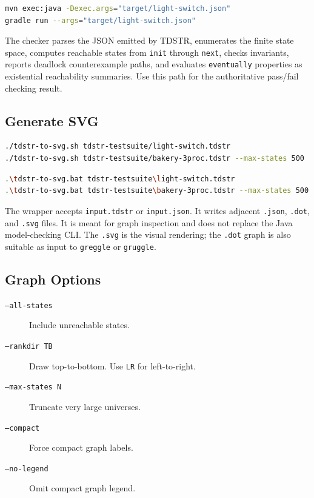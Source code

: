 \documentclass[11pt]{article}
\begin{document}
\begin{lstlisting}[language=bash]
mvn exec:java -Dexec.args="target/light-switch.json"
gradle run --args="target/light-switch.json"
\end{lstlisting}

The checker parses the JSON emitted by TDSTR, enumerates the finite state
space, computes reachable states from \texttt{init} through \texttt{next},
checks invariants, reports deadlock counterexample paths, and evaluates
\texttt{eventually} properties as existential reachability summaries.  Use this
path for the authoritative pass/fail checking result.

\subsection{Generate SVG}

\begin{lstlisting}[language=bash]
./tdstr-to-svg.sh tdstr-testsuite/light-switch.tdstr
./tdstr-to-svg.sh tdstr-testsuite/bakery-3proc.tdstr --max-states 500
\end{lstlisting}

\begin{lstlisting}[language=bash]
.\tdstr-to-svg.bat tdstr-testsuite\light-switch.tdstr
.\tdstr-to-svg.bat tdstr-testsuite\bakery-3proc.tdstr --max-states 500
\end{lstlisting}

The wrapper accepts \texttt{input.tdstr} or \texttt{input.json}.  It writes
adjacent \texttt{.json}, \texttt{.dot}, and \texttt{.svg} files.  It is meant
for graph inspection and does not replace the Java model-checking CLI.  The
\texttt{.svg} is the visual rendering; the \texttt{.dot} graph is also suitable
as input to \texttt{greggle} or \texttt{gruggle}.

\subsection{Graph Options}

\begin{description}
\item[\texttt{--all-states}] Include unreachable states.
\item[\texttt{--rankdir TB}] Draw top-to-bottom.  Use \texttt{LR} for
  left-to-right.
\item[\texttt{--max-states N}] Truncate very large universes.
\item[\texttt{--compact}] Force compact graph labels.
\item[\texttt{--no-legend}] Omit compact graph legend.
\end{description}
\end{document}
